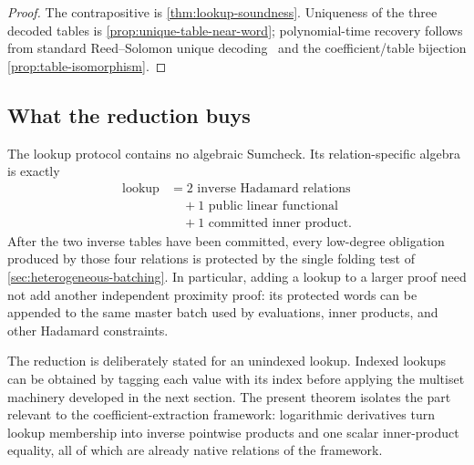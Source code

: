 \begin{proof}
The contrapositive is \cref{thm:lookup-soundness}.  Uniqueness of the three decoded tables is \cref{prop:unique-table-near-word}; polynomial-time recovery follows from standard Reed--Solomon unique decoding~\cite{WelchBerlekamp86,Gao03} and the coefficient/table bijection \cref{prop:table-isomorphism}.
\end{proof}

\subsection{What the reduction buys}
\label{sec:lookup-consequences}

The lookup protocol contains no algebraic Sumcheck.  Its relation-specific algebra is exactly
\begin{equation}
\begin{aligned}
  \text{lookup}
  &={}2\text{ inverse Hadamard relations}\\
  &\quad+1\text{ public linear functional}\\
  &\quad+1\text{ committed inner product}.
\end{aligned}
\label{eq:lookup-decomposition}
\end{equation}
After the two inverse tables have been committed, every low-degree obligation produced by those four relations is protected by the single folding test of \cref{sec:heterogeneous-batching}.  In particular, adding a lookup to a larger proof need not add another independent proximity proof: its protected words can be appended to the same master batch used by evaluations, inner products, and other Hadamard constraints.

The reduction is deliberately stated for an unindexed lookup.  Indexed lookups can be obtained by tagging each value with its index before applying the multiset machinery developed in the next section.  The present theorem isolates the part relevant to the coefficient-extraction framework: logarithmic derivatives turn lookup membership into inverse pointwise products and one scalar inner-product equality, all of which are already native relations of the framework.
